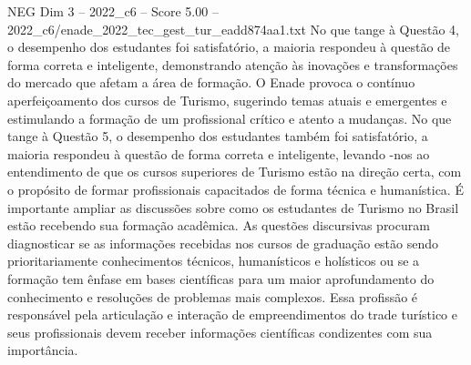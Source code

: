 \begin{textsample}{NEG Dim 3 – 2022\_c6 – Score 5.00 – 2022\_c6/enade\_2022\_tec\_gest\_tur\_eadd874aa1.txt}
No que tange à Questão 4, o desempenho dos estudantes foi satisfatório, a maioria respondeu à questão de forma correta e inteligente, demonstrando atenção às inovações e transformações do mercado que afetam a área de formação.
O Enade provoca o contínuo aperfeiçoamento dos cursos de Turismo, sugerindo temas atuais e emergentes e estimulando a formação de um profissional crítico e atento a mudanças.
No que tange à Questão 5, o desempenho dos estudantes também foi satisfatório, a maioria respondeu à questão de forma correta e inteligente, levando -nos ao entendimento de que os cursos superiores de Turismo estão na direção certa, com o propósito de formar profissionais capacitados de forma técnica e humanística.
É importante ampliar as discussões sobre como os estudantes de Turismo no Brasil estão recebendo sua formação acadêmica.
As questões discursivas procuram diagnosticar se as informações recebidas nos cursos de graduação estão sendo prioritariamente conhecimentos técnicos, humanísticos e holísticos ou se a formação tem ênfase em bases científicas para um maior aprofundamento do conhecimento e resoluções de problemas mais complexos.
Essa profissão é responsável pela articulação e interação de empreendimentos do trade turístico e seus profissionais devem receber informações científicas condizentes com sua importância.

\end{textsample}
